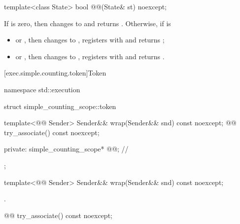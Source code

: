 %
\begin{itemdecl}
template<class State>
  bool @@(State& st) noexcept;
\end{itemdecl}

\begin{itemdescr}
\pnum
\effects
If  is zero, then
changes  to  and returns .
Otherwise, if  is
\begin{itemize}
\item
{} or , then
changes  to ,
registers  with  and returns ;
\item
{} or , then
changes  to ,
registers  with  and returns .
\end{itemize}
\end{itemdescr}

[exec.simple.counting.token]{Token}

%
\begin{codeblock}
namespace std::execution {
  struct simple_counting_scope::token {
    template<@@ Sender>
      Sender&& wrap(Sender&& snd) const noexcept;
    @@ try_associate() const noexcept;

  private:
    simple_counting_scope* @@;   // \expos
  };
}
\end{codeblock}

%
\begin{itemdecl}
template<@@ Sender>
  Sender&& wrap(Sender&& snd) const noexcept;
\end{itemdecl}

\begin{itemdescr}
\pnum
\returns
{}.
\end{itemdescr}

%
\begin{itemdecl}
@@ try_associate() const noexcept;
\end{itemdecl}

